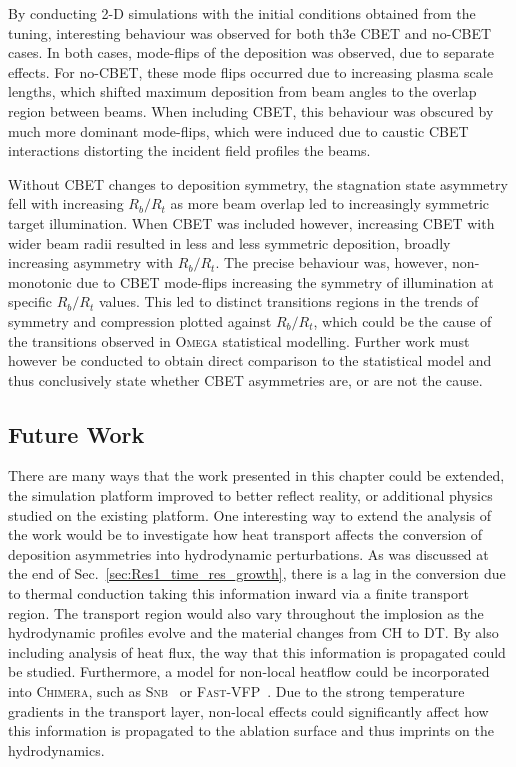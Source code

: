 By conducting 2-D simulations with the initial conditions obtained from the tuning, interesting behaviour was observed for both th3e \ac{CBET} and no-\ac{CBET} cases.
In both cases, mode-flips of the deposition was observed, due to separate effects.
For no-\ac{CBET}, these mode flips occurred due to increasing plasma scale lengths, which shifted maximum deposition from beam angles to the overlap region between beams.
When including \ac{CBET}, this behaviour was obscured by much more dominant mode-flips, which were induced due to caustic \ac{CBET} interactions distorting the incident field profiles the beams.

Without \ac{CBET} changes to deposition symmetry, the stagnation state asymmetry fell with increasing $R_b/R_t$ as more beam overlap led to increasingly symmetric target illumination.
When \ac{CBET} was included however, increasing \ac{CBET} with wider beam radii resulted in less and less symmetric deposition, broadly increasing asymmetry with $R_b/R_t$.
The precise behaviour was, however, non-monotonic due to \ac{CBET} mode-flips increasing the symmetry of illumination at specific $R_b/R_t$ values.
This led to distinct transitions regions in the trends of symmetry and compression plotted against $R_b/R_t$, which could be the cause of the transitions observed in \textsc{Omega} statistical modelling.
Further work must however be conducted to obtain direct comparison to the statistical model and thus conclusively state whether \ac{CBET} asymmetries are, or are not the cause.

\subsection{Future Work}%
\label{sec:Res1_future}

There are many ways that the work presented in this chapter could be extended, the simulation platform improved to better reflect reality, or additional physics studied on the existing platform.
One interesting way to extend the analysis of the work would be to investigate how heat transport affects the conversion of deposition asymmetries into hydrodynamic perturbations.
As was discussed at the end of Sec.~\ref{sec:Res1_time_res_growth}, there is a lag in the conversion due to thermal conduction taking this information inward via a finite transport region.
The transport region would also vary throughout the implosion as the hydrodynamic profiles evolve and the material changes from CH to DT.
By also including analysis of heat flux, the way that this information is propagated could be studied.
Furthermore, a model for non-local heatflow could be incorporated into \textsc{Chimera}, such as \textsc{Snb}~\cite{schurtz_nonlocal_2000,nicolai_practical_2006,cao_improved_2015} or \textsc{Fast-VFP}~\cite{bell_fast_2024}.
Due to the strong temperature gradients in the transport layer, non-local effects could significantly affect how this information is propagated to the ablation surface and thus imprints on the hydrodynamics.

